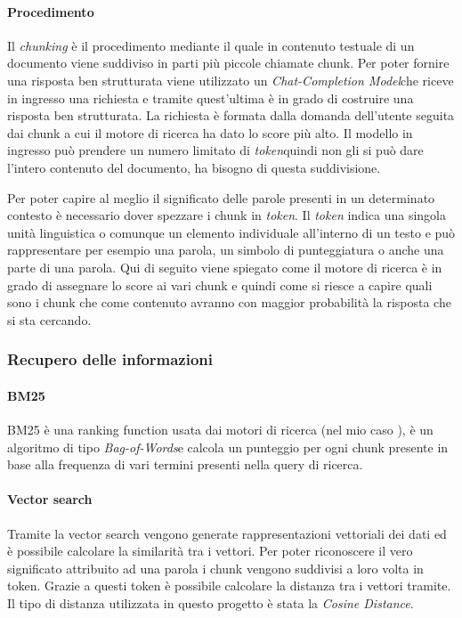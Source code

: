 \paragraph{Procedimento}
Il \emph{chunking} è il procedimento mediante il quale in contenuto testuale di un documento viene suddiviso in parti più piccole chiamate chunk.
\noindent Per poter fornire una risposta ben strutturata viene utilizzato un \emph{\gls{Chat-Completion Model}}\glsfirstoccur che riceve in ingresso una richiesta e tramite quest'ultima è in grado di costruire una risposta ben strutturata.
La richiesta è formata dalla domanda dell'utente seguita dai chunk a cui il motore di ricerca ha dato lo score più alto.
Il modello in ingresso può prendere un numero limitato di \emph{\gls{token}}\glsfirstoccur quindi non gli si può dare l'intero contenuto del documento, ha bisogno di questa suddivisione.

\noindent Per poter capire al meglio il significato delle parole presenti in un determinato contesto è necessario dover spezzare i chunk in \emph{token}.
Il \emph{token} indica una singola unità linguistica o comunque un elemento individuale all'interno di un testo e può rappresentare per esempio una parola, un simbolo di punteggiatura o anche una parte di una parola.
Qui di seguito viene spiegato come il motore di ricerca è in grado di assegnare lo score ai vari chunk e quindi come si riesce a capire quali sono i chunk che come contenuto avranno con maggior probabilità la risposta che si sta cercando.

\subsubsection{Recupero delle informazioni}
\label{subsubsec:rec-inf}
\paragraph{\gls{BM25}}
BM25 è una ranking function usata dai motori di ricerca (nel mio caso ), è un algoritmo di tipo \emph{\gls{Bag-of-Words}}\glsfirstoccur e calcola un punteggio per ogni chunk
presente in base alla frequenza di vari termini presenti nella query di ricerca. 

\paragraph{Vector search}
Tramite la vector search vengono generate rappresentazioni vettoriali dei dati ed è possibile calcolare la similarità tra i vettori.
Per poter riconoscere il vero significato attribuito ad una parola i chunk vengono suddivisi a loro volta in token.
Grazie a questi token è possibile calcolare la distanza tra i vettori tramite.
Il tipo di distanza utilizzata in questo progetto è stata la \emph{Cosine Distance}.

